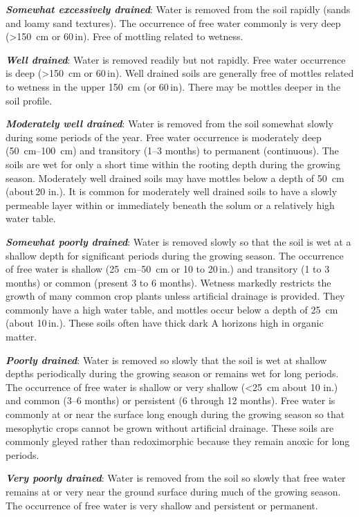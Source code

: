 \documentclass{article}
\begin{document}
\textbf{\textit{Somewhat excessively drained}}: Water is removed from the soil rapidly (sands and loamy sand textures). The occurrence of free water commonly is very deep (\textgreater{}\qty{150}{cm} or 60\,in). Free of mottling related to wetness.

\textbf{\textit{Well drained}}: Water is removed readily but not rapidly. Free water occurrence is deep (\textgreater{}\qty{150}{cm} or 60\,in). Well drained soils are generally free of mottles related to wetness in the upper \qty{150}{cm} (or 60\,in). There may be mottles deeper in the soil profile.

\textbf{\textit{Moderately well drained}}: Water is removed from the soil somewhat slowly during some periods of the year. Free water occurrence is moderately deep (\qtyrange{50}{100}{cm}) and transitory (\numrange{1}{3} months) to permanent (continuous). The soils are wet for only a short time within the rooting depth during the growing season. Moderately well drained soils may have mottles below a depth of \qty{50}{cm} (about\,20 in.). It is common for moderately well drained soils to have a slowly permeable layer within or immediately beneath the solum or a relatively high water table.

\textbf{\textit{Somewhat poorly drained}}: Water is removed slowly so that the soil is wet at a shallow depth for significant periods during the growing season. The occurrence of free water is shallow (\qtyrange{25}{50}{cm} or 10 to 20\,in.) and transitory (1 to 3 months) or common (present 3 to 6 months). Wetness markedly restricts the growth of many common crop plants unless artificial drainage is provided. They commonly have a high water table, and mottles occur below a depth of \qty{25}{cm} (about 10\,in.). These soils often have thick dark A horizons high in organic matter.

\textbf{\textit{Poorly drained}}: Water is removed so slowly that the soil is wet at shallow depths periodically during the growing season or remains wet for long periods. The occurrence of free water is shallow or very shallow (\textless{}\qty{25}{cm} about 10 in.) and common (\numrange{3}{6} months) or persistent (6 through 12 months). Free water is commonly at or near the surface long enough during the growing season so that mesophytic crops cannot be grown without artificial drainage. These soils are commonly gleyed rather than redoximorphic  because they remain anoxic for long periods.

\textbf{\textit{Very poorly drained}}: Water is removed from the soil so slowly that free water remains at or very near the ground surface during much of the growing season. The occurrence of free water is very shallow and persistent or permanent.
\end{document}
